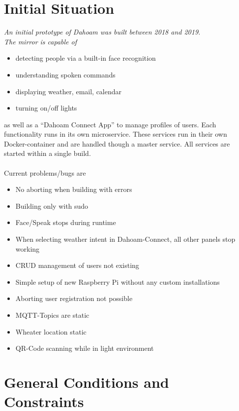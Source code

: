 \documentclass[12pt]{article}
\theoremstyle{definition}
\newenvironment{explanation}{%
   \setlength{\parindent}{0pt}
   \itshape
   \color{blue}
}{}
\begin{document}
\section{Initial Situation} 
\begin{explanation} \color{black} \normalfont
An initial prototype of Dahoam was built between 2018 and 2019. \\
 
The mirror is capable of
\begin{itemize}
	\item detecting people via a built-in face recognition
	\item understanding spoken commands
	\item displaying weather, email, calendar
	\item turning on/off lights
\end{itemize}


as well as a “Dahoam Connect App” to manage profiles of users. 
Each functionality runs in its own microservice. These services run in their own Docker-container and are handled though a master service. All services are started within a single build.\\ \\
Current problems/bugs are
\begin{itemize}
    \item No aborting when building with errors
    \item Building only with sudo
    \item Face/Speak stops during runtime
    \item When selecting weather intent in Dahoam-Connect, all other panels stop working
    \item CRUD management of users not existing
    \item Simple setup of new Raspberry Pi without any custom installations
    \item Aborting user registration not possible
    \item MQTT-Topics are static
    \item Wheater location static
    \item QR-Code scanning while in light environment
\end{itemize}

\end{explanation}

\pagebreak

\section{General Conditions and Constraints}
\end{document}
